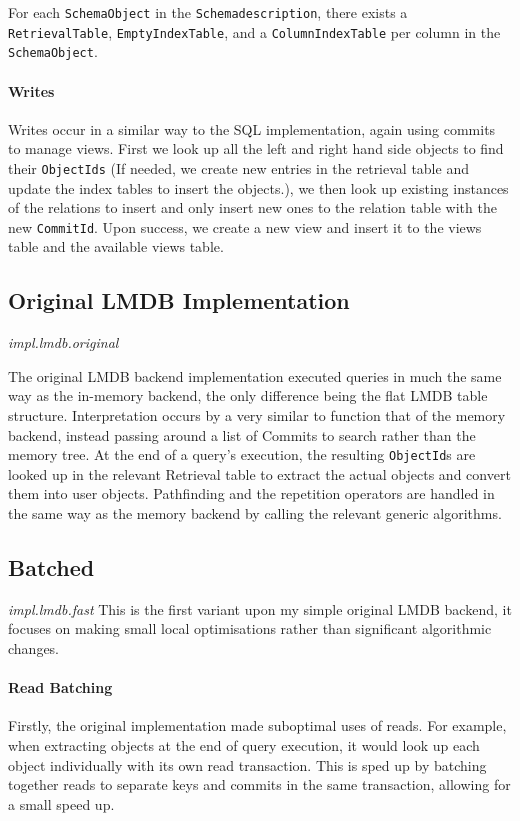 \documentclass[12pt,a4paper,twoside,openright]{report}
\newcommand\codeName[1]{\texttt{#1}}
\newcommand\note[1]{\textit{#1}}
\begin{document}
For each \codeName{SchemaObject} in the \codeName{Schemadescription}, there exists a \codeName{RetrievalTable}, \codeName{EmptyIndexTable}, and a \codeName{ColumnIndexTable} per column in the \codeName{SchemaObject}.
		
		
		\paragraph{Writes}
		Writes occur in a similar way to the SQL implementation, again using commits to manage views. First we look up all the left and right hand side objects to find their \codeName{ObjectIds} (If needed, we create new entries in the retrieval table and update the index tables to insert the objects.), we then look up existing instances of the relations to insert and only insert new ones to the relation table with the new \codeName{CommitId}. Upon success, we create a new view and insert it to the views table and the available views table.

	\subsection{Original LMDB Implementation}
	\note{impl.lmdb.original}

The original LMDB backend implementation executed queries in much the same way as the in-memory backend, the only difference being the flat LMDB table structure. Interpretation occurs by a very similar to function that of the memory backend, instead passing around a list of Commits to search rather than the memory tree. At the end of a query's execution, the resulting \codeName{ObjectId}s are looked up in the relevant Retrieval table to extract the actual objects and convert them into user objects. Pathfinding and the repetition operators are handled in the same way as the memory backend by calling the relevant generic algorithms.
 

	\subsection{Batched}
	\note{impl.lmdb.fast}
	This is the first variant upon my simple original LMDB backend, it focuses on making small local optimisations rather than significant algorithmic changes.
	
		\paragraph{Read Batching}
		Firstly, the original implementation made suboptimal uses of reads. For example, when extracting objects at the end of query execution, it would look up each object individually with its own read transaction. This is sped up by batching together reads to separate keys and commits in the same transaction, allowing for a small speed up.
		
\end{document}
